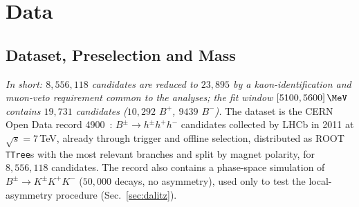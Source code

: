 \section{Data}
\label{sec:data}

\subsection{Dataset, Preselection and Mass}
\label{sec:data_presel}
\emph{In short: $8{,}556{,}118$ candidates are reduced to $23{,}895$ by a kaon-identification and muon-veto requirement common to the analyses; the fit window $[5100,5600]\,\MeV$ contains $19{,}731$ candidates ($10{,}292$ $B^+$, $9439$ $B^-$).}
The dataset is the CERN Open Data record 4900~\cite{opendata_record}: $B^{\pm}\to h^{\pm}h^{+}h^{-}$ candidates collected by LHCb in 2011 at $\sqrt{s}=7$\,TeV, already through trigger and offline selection, distributed as ROOT \texttt{TTree}s with the most relevant branches and split by magnet polarity, for $8{,}556{,}118$ candidates. The record also contains a phase-space simulation of $B^{\pm}\to K^{\pm}K^{+}K^{-}$ ($50{,}000$ decays, no asymmetry), used only to test the local-asymmetry procedure (Sec.~\ref{sec:dalitz}).

\begin{table}[h]
\centering
{}
\caption{Number of candidates passing each requirement alone and after the cumulative selection, in the order of the table, and by magnet polarity. The kaon-identification requirement on the three tracks is by far the most selective.}
\label{tab:cutflow}
\end{table}

